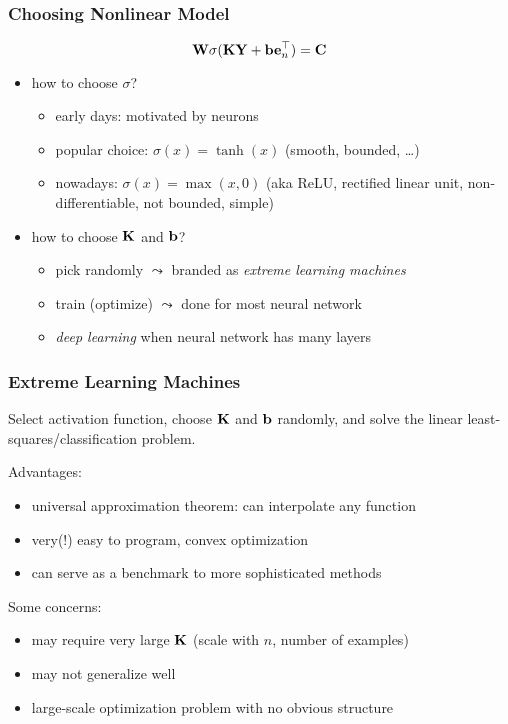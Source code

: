 \documentclass[12pt,fleqn,handout]{beamer}
\begin{document}
\begin{frame}\frametitle{Choosing Nonlinear Model}

$$ {\bf W}  \sigma({\bf K} {\bf Y}+ {\bf b}{\bf e}_n^\top)= {\bf C} $$
\begin{itemize}
\item how to choose $\sigma$?
\pause
\begin{itemize}
	\item early days: motivated by neurons
	\item popular choice: $\sigma(x) = \tanh(x)$ (smooth, bounded, \ldots)
	\item nowadays: $\sigma(x) = \max(x,0)$ (aka ReLU, rectified linear unit, non-differentiable, not bounded, simple)
\end{itemize}
\pause
\item how to choose ${\bf K}$ and ${\bf b}$?
\pause
\begin{itemize}
	\item pick randomly $\leadsto$ branded as \emph{extreme learning machines}~\cite{HuangEtAl2006}
	\item train (optimize) $\leadsto$ done for most neural network
	\item \emph{deep learning} when neural network has many layers
\end{itemize}
\end{itemize}
\end{frame}

\begin{frame}\frametitle{Extreme Learning Machines~\cite{HuangEtAl2006}}

Select activation function, choose ${\bf K}$ and ${\bf b}$ randomly, and solve the linear least-squares/classification problem.

\bigskip

Advantages:
\begin{itemize}
\item universal approximation theorem: can interpolate any function
\item very(!) easy to program, convex optimization
\item can serve as a benchmark to more sophisticated methods
\end{itemize}

\bigskip

Some concerns:
\begin{itemize}
\item may require very large ${\bf K}$ (scale with $n$, number of examples)
\item may not generalize well
\item large-scale optimization problem with no obvious structure
\end{itemize}

\end{frame}
\end{document}

